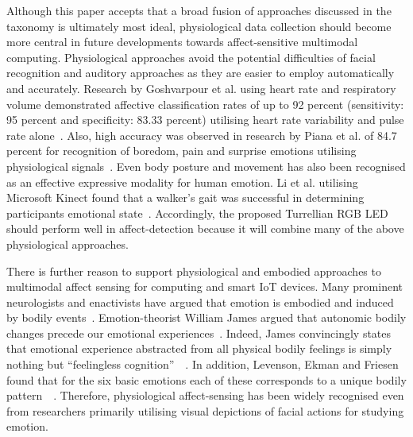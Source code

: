 \documentclass{sigchi}
\begin{document}
Although this paper accepts that a broad fusion of approaches discussed in the taxonomy is ultimately most ideal, physiological data collection should become more central in future developments towards affect-sensitive multimodal computing. Physiological approaches avoid the potential difficulties of facial recognition and auditory approaches as they are easier to employ automatically and accurately. Research by Goshvarpour et al. using heart rate and respiratory volume demonstrated affective classification rates of up to 92 percent (sensitivity: 95 percent and specificity: 83.33 percent) utilising heart rate variability and pulse rate alone~\cite{goshvarpour2017fusion}. Also, high accuracy was observed in research by Piana et al. of 84.7 percent for recognition of boredom, pain and surprise emotions utilising physiological signals~\cite{piana2014real}. Even body posture and movement has also been recognised as an effective expressive modality for human emotion. Li et al. utilising Microsoft Kinect found that a walker’s gait was successful in determining participants emotional state~\cite{li2016emotion}. Accordingly, the proposed Turrellian RGB LED should perform well in affect-detection because it will combine many of the above physiological approaches. 

There is further reason to support physiological and embodied approaches to multimodal affect sensing for computing and smart IoT devices. Many prominent neurologists and enactivists have argued that emotion is embodied and induced by bodily events~\cite{colombetti2008feeling}. Emotion-theorist William James argued that autonomic bodily changes precede our emotional experiences~\cite{james1994physical}. Indeed, James convincingly states that emotional experience abstracted from all physical bodily feelings is simply nothing but “feelingless cognition”~\cite{james1894discussion}~\cite{james1922emotions}. In addition, Levenson, Ekman and Friesen found that for the six basic emotions each of these corresponds to a unique bodily pattern~\cite{levenson1990voluntary}~\cite{prinz2004gut}. Therefore, physiological affect-sensing has been widely recognised even from researchers primarily utilising visual depictions of facial actions for studying emotion.
\end{document}
